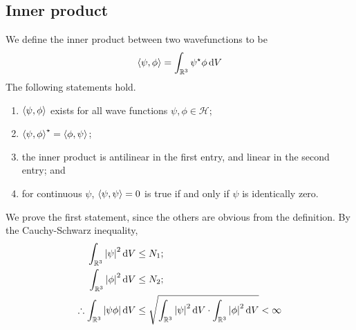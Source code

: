 \subsection{Inner product}
We define the inner product between two wavefunctions to be
\[
	\left\langle{\psi,\phi}\right\rangle = \int_{\mathbb R^3} \psi^\star \phi \dd{V}
\]
The following statements hold.
\begin{enumerate}
	\item \( \left\langle{\psi, \phi}\right\rangle \) exists for all wave functions \( \psi, \phi \in \mathcal H \);
	\item \( \left\langle{\psi, \phi}\right\rangle^\star = \left\langle{\phi, \psi}\right\rangle \);
	\item the inner product is antilinear in the first entry, and linear in the second entry; and
	\item for continuous \( \psi \), \( \left\langle{\psi, \psi}\right\rangle = 0 \) is true if and only if \( \psi \) is identically zero.
\end{enumerate}
We prove the first statement, since the others are obvious from the definition.
By the Cauchy-Schwarz inequality,
\begin{align*}
	\int_{\mathbb R^3} \abs{\psi}^2 \dd{V}               & \leq N_1;                                                                                                \\
	\int_{\mathbb R^3} \abs{\phi}^2 \dd{V}               & \leq N_2;                                                                                                \\
	\therefore \int_{\mathbb R^3} \abs{\psi \phi} \dd{V} & \leq \sqrt{\int_{\mathbb R^3} \abs{\psi}^2 \dd{V} \cdot \int_{\mathbb R^3} \abs{\phi}^2 \dd{V}} < \infty \\
\end{align*}

